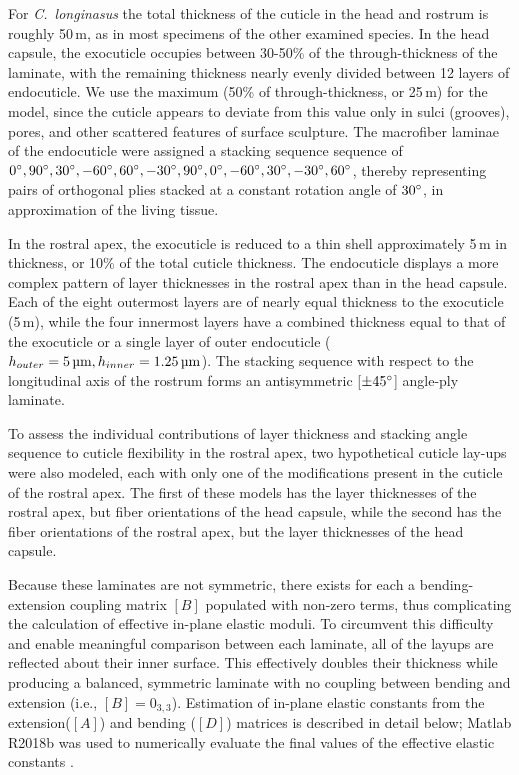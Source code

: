 \documentclass[twocolumn, linenumbers, superscriptaddress, nofootinbib]{revtex4-1}
\begin{document}
				For \textit{C.~longinasus} the total thickness of the cuticle in the head and rostrum is roughly 50\,{\textmu}m, as in most specimens of the other examined species.
				In the head capsule, the exocuticle occupies between 30-50\% of the through-thickness of the laminate, with the remaining thickness nearly evenly divided between 12 layers of endocuticle.
				We use the maximum (50\% of through-thickness, or 25\,{\textmu}m) for the model, since the cuticle appears to deviate from this value only in sulci (grooves), pores, and other scattered features of surface sculpture.
				The macrofiber laminae of the endocuticle were assigned a stacking sequence sequence of $0\degree, 90\degree, 30\degree, -60\degree, 60\degree, -30\degree, 90\degree, 0\degree, -60\degree, 30\degree, -30\degree, 60\degree$, thereby representing pairs of orthogonal plies stacked at a constant rotation angle of $30\degree$, in approximation of the living tissue.
				
				In the rostral apex, the exocuticle is reduced to a thin shell approximately 5\,{\textmu}m in thickness, or 10\% of the total cuticle thickness.
				The endocuticle displays a more complex pattern of layer thicknesses in the rostral apex than in the head capsule.
				Each of the eight outermost layers are of nearly equal thickness to the exocuticle (5\,{\textmu}m), while the four innermost layers have a combined thickness equal to that of the exocuticle or a single layer of outer endocuticle ($h_{outer}=5\,\text{{\textmu}m}, h_{inner}=1.25\,\text{{\textmu}m}$).
				The stacking sequence with respect to the longitudinal axis of the rostrum forms an antisymmetric [$\pm45\degree$] angle-ply laminate.
				
				To assess the individual contributions of layer thickness and stacking angle sequence to cuticle flexibility in the rostral apex, two hypothetical cuticle lay-ups were also modeled, each with only one of the modifications present in the cuticle of the rostral apex.
				The first of these models has the layer thicknesses of the rostral apex, but fiber orientations of the head capsule, while the second has the fiber orientations of the rostral apex, but the layer thicknesses of the head capsule.
				
				Because these laminates are not symmetric, there exists for each a bending-extension coupling matrix $[B]$ populated with non-zero terms, thus complicating the calculation of effective in-plane elastic moduli.
				To circumvent this difficulty and enable meaningful comparison between each laminate, all of the layups are reflected about their inner surface.
				This effectively doubles their thickness while producing a balanced, symmetric laminate with no coupling between bending and extension (i.e., $[B]=0_{3,3}$).
				Estimation of in-plane elastic constants from the extension($[A]$) and bending ($[D]$) matrices is described in detail below; Matlab R2018b was used to numerically evaluate the final values of the effective elastic constants \cite{Matlab}.
				
\end{document}
